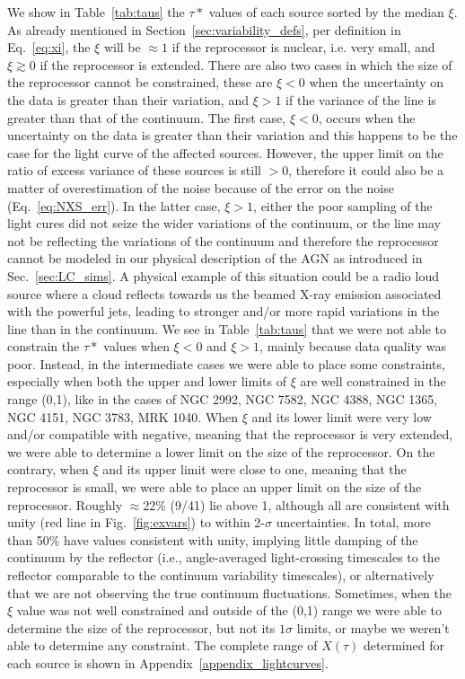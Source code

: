 We show in Table~\ref{tab:taus} the $\tau*$ values of each source sorted by the median $\xi$. As already mentioned in Section~\ref{sec:variability_defs}, per definition in Eq.~\ref{eq:xi}, the $\xi$ will be $\approx 1$ if the reprocessor is nuclear, i.e. very small, and $\xi\gtrsim 0$ if the reprocessor is extended. 
There are also two cases in which the size of the reprocessor cannot be constrained, these are $\xi<0$ when the uncertainty on the data is greater than their variation, and $\xi>1$ if the variance of the \kalfa{} line is greater than that of the continuum. 
The first case, $\xi<0$, occurs when the uncertainty on the data is greater than their variation and this happens to be the case for the \kalfa{} light curve of the affected sources. However, the upper limit on the ratio of excess variance of these sources is still $>0$, therefore it could also be a matter of overestimation of the noise because of the error on the noise (Eq.~\ref{eq:NXS_err}).
In the latter case, $\xi>1$, either the poor sampling of the light cures did not seize the wider variations of the continuum, or the \kalfa{} line may not be reflecting the variations of the continuum and therefore the reprocessor cannot be modeled in our physical description of the AGN as introduced in Sec.~\ref{sec:LC_sims}. A physical example of this situation could be a radio loud source where a cloud reflects towards us the beamed X-ray emission associated with the powerful jets, leading to stronger and/or more rapid variations in the \kalfa{} line than in the continuum.
We see in Table~\ref{tab:taus} that we were not able to constrain the $\tau*$ values when $\xi<0$ and $\xi>1$, mainly because data quality was poor. Instead, in the intermediate cases we were able to place some constraints, especially when both the upper and lower limits of $\xi$ are well constrained in the range (0,1), like in the cases of NGC 2992, NGC 7582, NGC 4388, NGC 1365, NGC 4151, NGC 3783, MRK 1040. When $\xi$ and its lower limit were very low and/or compatible with negative, meaning that the reprocessor is very extended, we were able to determine a lower limit on the size of the reprocessor. On the contrary, when $\xi$ and its upper limit were close to one, meaning that the reprocessor is small, we were able to place an upper limit on the size of the reprocessor. Roughly $\approx$22\% (9/41) lie above 1, although all are consistent with unity (red line in Fig.~\ref{fig:exvars}) to within 2-$\sigma$ uncertainties. In total, more than 50\% have values consistent with unity, implying little damping of the continuum by the reflector (i.e., angle-averaged light-crossing timescales to the reflector comparable to the continuum variability timescales), or alternatively that we are not observing the true continuum fluctuations. Sometimes, when the $\xi$ value was not well constrained and outside of the (0,1) range we were able to determine the size of the reprocessor, but not its $1\sigma$ limits, or maybe we weren't able to determine any constraint. The complete range of $X(\tau)$ determined for each source is shown in Appendix~\ref{appendix_lightcurves}.

